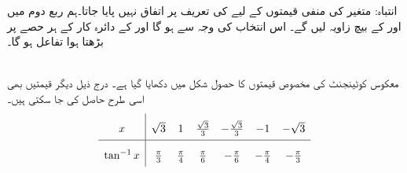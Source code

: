 انتباہ: \quad
متغیر  کی منفی قیمتوں کے لیے  کی تعریف پر اتفاق نہیں پایا جاتا۔ہم ربع دوم میں  اور  کے بیچ زاویہ لیں گے۔ اس انتخاب کی وجہ سے  ہو گا اور  کے دائرہ کار کے ہر حصے  پر  بڑھتا ہوا تفاعل ہو گا۔

\\
معکوس کوٹینجنٹ کی مخصوص قیمتوں کا حصول شکل  میں دکھایا گیا ہے۔ درج ذیل دیگر قیمتیں بھی اسی طرح حاصل کی جا سکتی ہیں۔
\begin{align*}
\renewcommand{\arraystretch}{2} 
\begin{array}{c|cccccc}
x&\sqrt{3}&1&\tfrac{\sqrt{3}}{3}&-\tfrac{\sqrt{3}}{3}&-1&-\sqrt{3}\\
\hline
\tan^{-1}x&\tfrac{\pi}{3}&\tfrac{\pi}{4}&\tfrac{\pi}{6}&-\tfrac{\pi}{6}&-\tfrac{\pi}{4}&-\tfrac{\pi}{3}
\end{array}
\end{align*}
